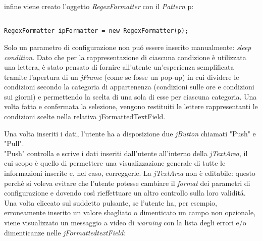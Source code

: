 infine viene creato l'oggetto \textit{RegexFormatter} con il \textit{Pattern} p:


\vspace{0.5cm}

\begin{lstlisting}

RegexFormatter ipFormatter = new RegexFormatter(p);

\end{lstlisting}


Solo un parametro di configurazione non pu\'{o} essere inserito manualmente: \textit{sleep condition}. Dato che per la rappresentazione di ciascuna condizione \`{e} utilizzata una lettera, \`{e} stato pensato di fornire all'utente un'esperienza semplificata tramite l'apertura di un \textit{jFrame} (come se fosse un pop-up) in cui dividere le condizioni secondo la categoria di appartenenza (condizioni sulle ore e condizioni sui giorni) e permettendo la scelta di una sola di esse per ciascuna categoria. Una volta fatta e confermata la selezione, vengono restituiti le lettere rappresentanti le condizioni scelte nella relativa {jFormattedTextField}. 


Una volta inseriti i dati, l'utente ha a disposizione due \textit{jButton} chiamati "Push" e "Pull".\\


"Push" controlla e scrive i dati inseriti dall'utente all'interno della \textit{jTextArea}, il cui scopo \`{e} quello di permettere una visualizzazione generale di tutte le informazioni inserite e, nel caso, correggerle. La \textit{jTextArea} non \`{e} editabile: questo perch\`{e} si voleva evitare che l'utente potesse cambiare il \textit{format} dei parametri di configurazione e dovendo cos\`{i} rieffettuare un altro controllo sulla loro validit\'a.\\

Una volta cliccato sul suddetto pulsante, se l'utente ha, per esempio, erroneamente inserito un valore sbagliato o dimenticato un campo non opzionale, viene visualizzato un messaggio a video di \textit{warning} con la lista degli errori e/o dimenticanze nelle \textit{jFormattedtextField}:

